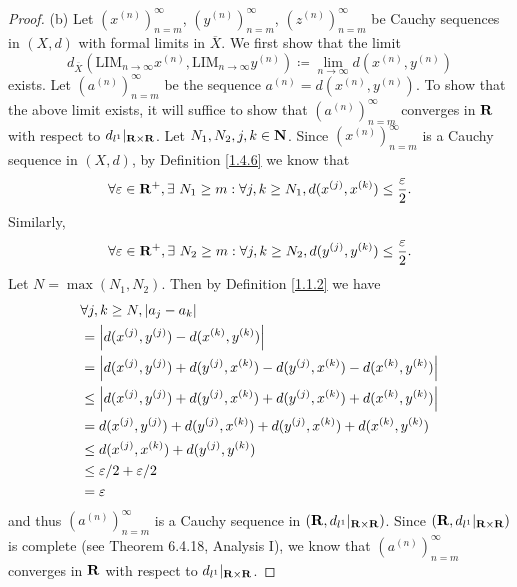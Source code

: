 \begin{proof}{(b)}
    Let \((x^{(n)})_{n = m}^\infty\), \((y^{(n)})_{n = m}^\infty\), \((z^{(n)})_{n = m}^\infty\) be Cauchy sequences in \((X, d)\) with formal limits in \(\overline{X}\).
    We first show that the limit
    \[
        d_{\overline{X}}(\text{LIM}_{n \to \infty} x^{(n)}, \text{LIM}_{n \to \infty} y^{(n)}) \coloneqq \lim_{n \to \infty} d(x^{(n)}, y^{(n)})
    \]
    exists.
    Let \((a^{(n)})_{n = m}^\infty\) be the sequence \(a^{(n)} = d(x^{(n)}, y^{(n)})\).
    To show that the above limit exists, it will suffice to show that \((a^{(n)})_{n = m}^\infty\) converges in \(\mathbf{R}\) with respect to \(d_{l^1}|_{\mathbf{R} \times \mathbf{R}}\).
    Let \(N_1, N_2, j, k \in \mathbf{N}\).
    Since \((x^{(n)})_{n = m}^\infty\) is a Cauchy sequence in \((X, d)\), by Definition \ref{1.4.6} we know that
    \[
        \forall \varepsilon \in \mathbf{R}^+, \exists\ N_1 \geq m : \forall j, k \geq N_1, d(x^{(j)}, x^{(k)}) \leq \frac{\varepsilon}{2}.
    \]
    Similarly,
    \[
        \forall \varepsilon \in \mathbf{R}^+, \exists\ N_2 \geq m : \forall j, k \geq N_2, d(y^{(j)}, y^{(k)}) \leq \frac{\varepsilon}{2}.
    \]
    Let \(N = \max(N_1, N_2)\).
    Then by Definition \ref{1.1.2} we have
    \begin{align*}
         & \forall j, k \geq N, \left\lvert a_j - a_k\right\rvert                                                             \\
         & = \left\lvert d(x^{(j)}, y^{(j)}) - d(x^{(k)}, y^{(k)})\right\rvert                                                \\
         & = \left\lvert d(x^{(j)}, y^{(j)}) + d(y^{(j)}, x^{(k)}) - d(y^{(j)}, x^{(k)}) - d(x^{(k)}, y^{(k)})\right\rvert    \\
         & \leq \left\lvert d(x^{(j)}, y^{(j)}) + d(y^{(j)}, x^{(k)}) + d(y^{(j)}, x^{(k)}) + d(x^{(k)}, y^{(k)})\right\rvert \\
         & = d(x^{(j)}, y^{(j)}) + d(y^{(j)}, x^{(k)}) + d(y^{(j)}, x^{(k)}) + d(x^{(k)}, y^{(k)})          \\
         & \leq d(x^{(j)}, x^{(k)}) + d(y^{(j)}, y^{(k)})                                                   \\
         & \leq \varepsilon / 2 + \varepsilon / 2                                                           \\
         & = \varepsilon
    \end{align*}
    and thus \((a^{(n)})_{n = m}^\infty\) is a Cauchy sequence in \((\mathbf{R}, d_{l^1}|_{\mathbf{R} \times \mathbf{R}})\).
    Since \((\mathbf{R}, d_{l^1}|_{\mathbf{R} \times \mathbf{R}})\) is complete (see Theorem 6.4.18, Analysis I), we know that \((a^{(n)})_{n = m}^\infty\) converges in \(\mathbf{R}\) with respect to \(d_{l^1}|_{\mathbf{R} \times \mathbf{R}}\).


\end{proof}
